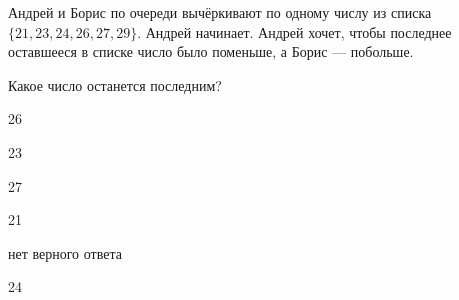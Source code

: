 
\begin{question}
Андрей и Борис по очереди вычёркивают по одному числу из списка \(\{21, 23, 24, 26, 27, 29\}\). Андрей начинает. Андрей хочет, чтобы последнее оставшееся в списке число было поменьше, а Борис --- побольше.

Какое число останется последним?
\begin{answerlist}
  \item 26
  \item 23
  \item 27
  \item 21
  \item нет верного ответа
  \item 24
\end{answerlist}
\end{question}


